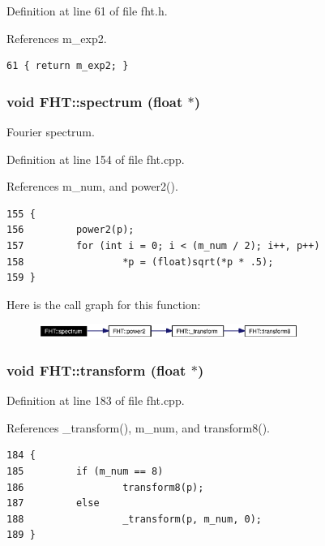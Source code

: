 Definition at line 61 of file fht.h.

References m\_\-exp2.



\footnotesize\begin{verbatim}61 { return m_exp2; }
\end{verbatim}\normalsize 
{}
\subsubsection{\setlength{\rightskip}{0pt plus 5cm}void FHT::spectrum (float $\ast$)}\label{classFHT_FHTa11}


Fourier spectrum.

Definition at line 154 of file fht.cpp.

References m\_\-num, and power2().



\footnotesize\begin{verbatim}155 {
156         power2(p);
157         for (int i = 0; i < (m_num / 2); i++, p++)
158                 *p = (float)sqrt(*p * .5);
159 }
\end{verbatim}\normalsize 


Here is the call graph for this function:\begin{figure}[H]
\begin{center}
\leavevmode
\includegraphics[width=240pt]{classFHT_FHTa11_cgraph}
\end{center}
\end{figure}
\subsubsection{\setlength{\rightskip}{0pt plus 5cm}void FHT::transform (float $\ast$)}\label{classFHT_FHTa15}




Definition at line 183 of file fht.cpp.

References \_\-transform(), m\_\-num, and transform8().



\footnotesize\begin{verbatim}184 {
185         if (m_num == 8)
186                 transform8(p);
187         else
188                 _transform(p, m_num, 0);
189 }
\end{verbatim}\normalsize 


